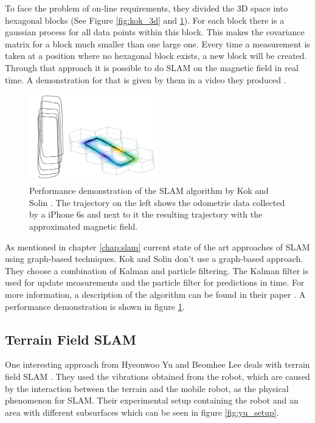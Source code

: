 To face the problem of on-line requirements, they divided the 3D space into hexagonal blocks
(See Figure \ref{fig:kok_3d} and \ref{fig:kok_example}). For each block there is a gaussian 
process for all data points within this block. This makes the covariance matrix for a block
much smaller than one large one. Every time a measurement is taken at a position where no hexagonal 
block exists, a new block will be created. Through that approach it is possible to do SLAM on the 
magnetic field in real time. A demonstration for that is given by them in a video they produced 
\cite{kok_scalable_2018}.

\begin{figure}[h!]
	\centering
	\includegraphics[width=0.5\textwidth]{images/kok_example.png}
	\caption{
        Performance demonstration of the SLAM algorithm by Kok and Solin \cite{kok_scalable_2018}.
        The trajectory on the left shows the odometrie data collected by a iPhone 6s and next to it
        the resulting trajectory with the approximated magnetic field.
        }
	\label{fig:kok_example}
\end{figure}

As mentioned in chapter \ref{chap:slam} current state of the art approaches of SLAM using graph-based
techniques. Kok and Solin don't use a graph-based approach. They choose a combination of Kalman
and particle filtering. The Kalman filter is used for update measurements and the particle filter
for predictions in time. For more information, a description of the algorithm can be found in their
paper \cite{kok_scalable_2018}. A performance demonstration is shown in figure \ref{fig:kok_example}.

\subsection{Terrain Field SLAM}
\label{chap:terrain_field}
One interesting approach from Hyeonwoo Yu and Beomhee Lee deals with terrain field SLAM \cite{yu_terrain_2018}. 
They used the vibrations obtained from the robot, which are caused by the interaction between the terrain and 
the mobile robot, as the physical phenomenon for SLAM. Their experimental setup containing the robot and an
area with different subsurfaces which can be seen in figure \ref{fig:yu_setup}.

